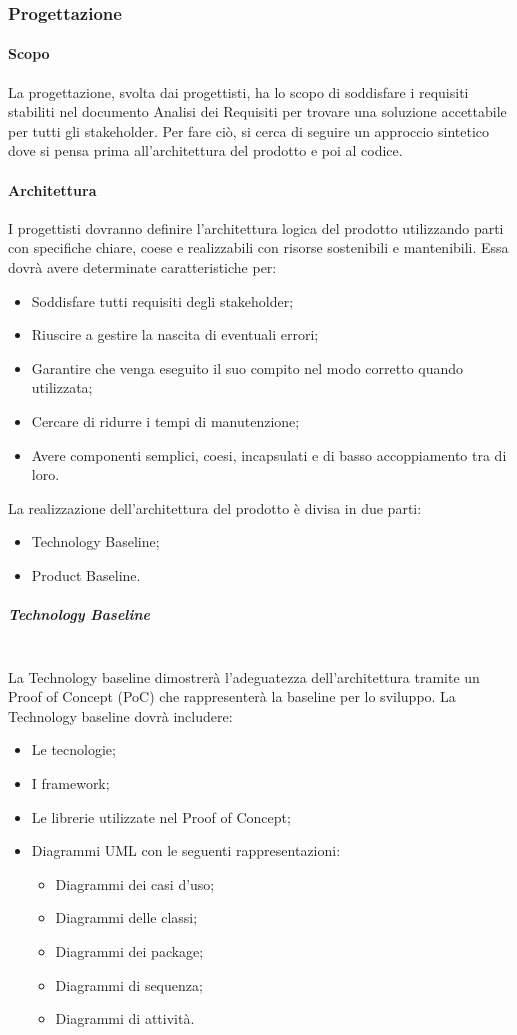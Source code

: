 
	\subsubsection{Progettazione}
	\paragraph{Scopo}
	La progettazione, svolta dai progettisti, ha lo scopo di soddisfare i requisiti stabiliti nel documento Analisi dei Requisiti per trovare una soluzione accettabile per tutti gli stakeholder.
	Per fare ciò, si cerca di seguire un approccio sintetico dove si pensa prima all’architettura del prodotto e poi al codice.
	\paragraph{Architettura}	I progettisti dovranno definire l’architettura logica del prodotto utilizzando parti con specifiche chiare, coese e realizzabili con risorse sostenibili e mantenibili. Essa dovrà avere determinate caratteristiche per:
	\begin{itemize}
		\item	Soddisfare tutti requisiti degli stakeholder;
		\item	Riuscire a gestire la nascita di eventuali errori;
		\item	Garantire che venga eseguito il suo compito nel modo corretto quando utilizzata;
		\item	Cercare di ridurre i tempi di manutenzione;
		\item Avere componenti semplici, coesi, incapsulati e di basso accoppiamento tra di loro.
	\end{itemize}
	La realizzazione dell’architettura del prodotto è divisa in due parti:
	\begin{itemize}
		\item Technology Baseline;
		\item Product Baseline.
	\end{itemize}
	\subparagraph{Technology Baseline}\mbox{}\\
	La Technology baseline dimostrerà l’adeguatezza dell’architettura tramite un Proof of Concept (PoC) che rappresenterà la baseline per lo sviluppo. 
	La Technology baseline dovrà includere:
	\begin{itemize}
		\item Le tecnologie;
		\item I framework;
		\item Le librerie utilizzate nel Proof of Concept;
		\item Diagrammi UML con le seguenti rappresentazioni:
		\begin{itemize}
			\item 	Diagrammi dei casi d’uso; 
			\item 	Diagrammi delle classi; 
			\item 	Diagrammi dei package;
			\item 	Diagrammi di sequenza; 
			\item 	Diagrammi di attività.
		\end{itemize}
	\end{itemize}
